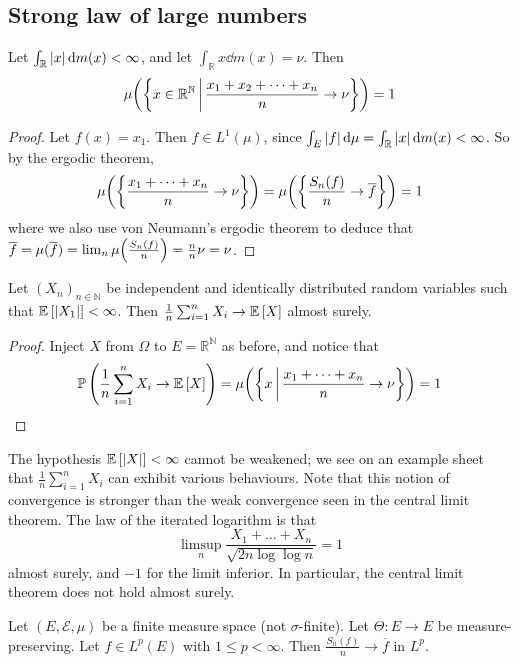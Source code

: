 \subsection{Strong law of large numbers}
\begin{theorem}
	Let \( \int_{\mathbb R} \abs{x} \dd{m(x)} < \infty \), and let \( \int_{\mathbb R} x \dd{m(x)} = \nu \).
	Then
	\[ \mu\qty(\qty{x \in \mathbb R^{\mathbb N} \,\middle|\,\frac{x_1 + x_2 + \dots + x_n}{n} \to \nu}) = 1 \]
\end{theorem}
\begin{proof}
	Let \( f(x) = x_1 \).
	Then \( f \in L^1(\mu) \), since \( \int_E \abs{f} \dd{\mu} = \int_{\mathbb R} \abs{x} \dd{m(x)} < \infty \).
	So by the ergodic theorem,
	\[ \mu\qty(\qty{ \frac{x_1 + \dots + x_n}{n} \to \nu }) = \mu\qty(\qty{ \frac{S_n(f)}{n} \to \overline f }) = 1 \]
	where we also use von Neumann's ergodic theorem to deduce that \( \overline f = \mu(\overline f) = \lim_n \mu\qty(\frac{S_n(f)}{n}) = \frac{n}{n} \nu = \nu \).
\end{proof}
\begin{theorem}
	Let \( (X_n)_{n \in \mathbb N} \) be independent and identically distributed random variables such that \( \mathbb{E}\left[{\abs{X_1}}\right] < \infty \).
	Then \( \frac{1}{n} \sum_{i=1}^n X_i \to \mathbb{E}\left[{X}\right] \) almost surely.
\end{theorem}
\begin{proof}
	Inject \( X \) from \( \Omega \) to \( E = \mathbb R^{\mathbb N} \) as before, and notice that
	\[ \mathbb{P}\left({\frac{1}{n} \sum_{i=1}^n X_i \to \mathbb{E}\left[{X}\right]}\right) = \mu\qty(\qty{ x \,\middle|\,\frac{x_1 + \dots + x_n}{n} \to \nu }) = 1 \]
\end{proof}
\begin{remark}
	The hypothesis \( \mathbb{E}\left[{\abs{X}}\right] < \infty \) cannot be weakened; we see on an example sheet that \( \frac{1}{n} \sum_{i=1}^n X_i \) can exhibit various behaviours.
	Note that this notion of convergence is stronger than the weak convergence seen in the central limit theorem.
	The law of the iterated logarithm is that
	\[ \limsup_n \frac{X_1 + \dots + X_n}{\sqrt{2 n \log \log n}} = 1 \]
	almost surely, and \( -1 \) for the limit inferior.
	In particular, the central limit theorem does not hold almost surely.
\end{remark}
\begin{theorem}
	Let \( (E, \mathcal E, \mu) \) be a finite measure space (not \( \sigma \)-finite).
	Let \( \Theta \colon E \to E \) be measure-preserving.
	Let \( f \in L^p(E) \) with \( 1 \leq p < \infty \).
	Then \( \frac{S_n(f)}{n} \to \overline f \) in \( L^p \).
\end{theorem}
